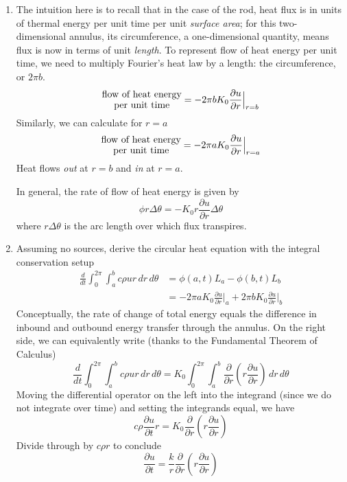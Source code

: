 \documentclass[a4paper]{article}
\begin{document}
\begin{enumerate}[label=(\alph*)]
\[	\]
	\item The intuition here is to recall that in the case of the rod, heat flux is in units of thermal energy per unit time per unit \textit{surface area}; for this two-dimensional annulus, its circumference, a one-dimensional quantity, means flux is now in terms of unit \textit{length}. To represent flow of heat energy per unit time, we need to multiply Fourier's heat law by a length: the circumference, or \( 2 \pi b \).
	\[
		\vcenter{\hbox{\shortstack{flow of heat energy \\ per unit time}}}
		= 
		-2 \pi b K_{0} \frac{\partial u}{\partial r} \Big|_{r=b}
	\]
	Similarly, we can calculate for \( r = a \)
	\[
		\vcenter{\hbox{\shortstack{flow of heat energy \\ per unit time}}}
		= 
		-2 \pi a K_{0} \frac{\partial u}{\partial r} \Big|_{r=a} 
	\]
	Heat flows \textit{out} at \( r = b \) and \textit{in} at \( r = a \).

	In general, the rate of flow of heat energy is given by
	\[
		\phi r \Delta \theta = -K_{0}r \frac{\partial u}{\partial r} \Delta \theta 
	\]
	where \( r \Delta \theta \) is the arc length over which flux transpires.
	\item Assuming no sources, derive the circular heat equation with the integral conservation setup 
	\begin{align*}
		\frac{d }{dt}\int^{2 \pi}_{0} \int^{b}_{a} c \rho u r \, dr \, d \theta & = \phi \!\left( a,t \right)L_{a} - \phi \!\left( b,t \right)L_{b} \\
											& = -2 \pi a K_{0}\frac{\partial u}{\partial r}\Big|_{a} + 2 \pi b K_{0}\frac{\partial u}{\partial r}\Big|_{b}
	\end{align*}
	Conceptually, the rate of change of total energy equals the difference in inbound and outbound energy transfer through the annulus. On the right side, we can equivalently write (thanks to the Fundamental Theorem of Calculus)
	\[
		\frac{d }{dt}\int^{2 \pi}_{0} \int^{b}_{a} c \rho u r \, dr \, d \theta = K_{0}\int^{2 \pi}_{0} \int^{b}_{a} \frac{\partial }{\partial r} \!\left( r \frac{\partial u}{\partial r} \right) \, dr \, d \theta 
	\]
	Moving the differential operator on the left into the integrand (since we do not integrate over time) and setting the integrands equal, we have
	\[
		c \rho \frac{\partial u}{\partial t}r = K_{0}\frac{\partial }{\partial r}\!\left( r \frac{\partial u}{\partial r} \right) 
	\]
	Divide through by \( c \rho r \) to conclude
	\[
		\frac{\partial u}{\partial t} = \frac{k}{r}\frac{\partial }{\partial r}\!\left( r \frac{\partial u}{\partial r} \right) 
	\]
\end{enumerate}
\end{document}
